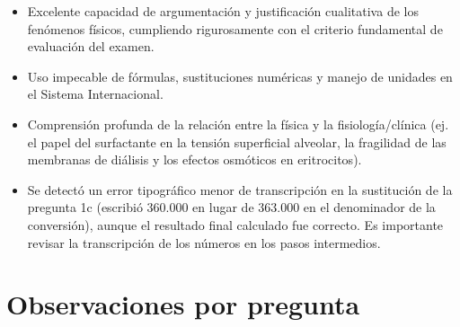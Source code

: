 \documentclass[11pt,a4paper]{article}
\begin{document}
\vspace{4pt}
\begin{minipage}[t]{0.48\linewidth}
  \begin{tcolorbox}[cajaFortaleza, title={Fortalezas}]
\begin{itemize}[leftmargin=1.5em, itemsep=2pt]
  \item Excelente capacidad de argumentación y justificación cualitativa de los fenómenos físicos, cumpliendo rigurosamente con el criterio fundamental de evaluación del examen.
  \item Uso impecable de fórmulas, sustituciones numéricas y manejo de unidades en el Sistema Internacional.
  \item Comprensión profunda de la relación entre la física y la fisiología/clínica (ej. el papel del surfactante en la tensión superficial alveolar, la fragilidad de las membranas de diálisis y los efectos osmóticos en eritrocitos).
\end{itemize}
  \end{tcolorbox}
\end{minipage}
\hfill
\begin{minipage}[t]{0.48\linewidth}
  \begin{tcolorbox}[cajaMejora, title={Areas de mejora}]
\begin{itemize}[leftmargin=1.5em, itemsep=2pt]
  \item Se detectó un error tipográfico menor de transcripción en la sustitución de la pregunta 1c (escribió 360.000 en lugar de 363.000 en el denominador de la conversión), aunque el resultado final calculado fue correcto. Es importante revisar la transcripción de los números en los pasos intermedios.
\end{itemize}
  \end{tcolorbox}
\end{minipage}

\section*{Observaciones por pregunta}
\end{document}
